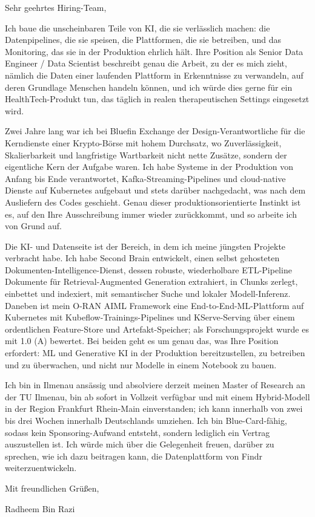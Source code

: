 \documentclass[11pt,a4paper]{coverletter}
\begin{document}
\opening{Sehr geehrtes Hiring-Team,}

Ich baue die unscheinbaren Teile von KI, die sie verlässlich machen: die Datenpipelines, die sie speisen, die Plattformen, die sie betreiben, und das Monitoring, das sie in der Produktion ehrlich hält. Ihre Position als Senior Data Engineer / Data Scientist beschreibt genau die Arbeit, zu der es mich zieht, nämlich die Daten einer laufenden Plattform in Erkenntnisse zu verwandeln, auf deren Grundlage Menschen handeln können, und ich würde dies gerne für ein HealthTech-Produkt tun, das täglich in realen therapeutischen Settings eingesetzt wird.

Zwei Jahre lang war ich bei Bluefin Exchange der Design-Verantwortliche für die Kerndienste einer Krypto-Börse mit hohem Durchsatz, wo Zuverlässigkeit, Skalierbarkeit und langfristige Wartbarkeit nicht nette Zusätze, sondern der eigentliche Kern der Aufgabe waren. Ich habe Systeme in der Produktion von Anfang bis Ende verantwortet, Kafka-Streaming-Pipelines und cloud-native Dienste auf Kubernetes aufgebaut und stets darüber nachgedacht, was nach dem Ausliefern des Codes geschieht. Genau dieser produktionsorientierte Instinkt ist es, auf den Ihre Ausschreibung immer wieder zurückkommt, und so arbeite ich von Grund auf.

Die KI- und Datenseite ist der Bereich, in dem ich meine jüngsten Projekte verbracht habe. Ich habe Second Brain entwickelt, einen selbst gehosteten Dokumenten-Intelligence-Dienst, dessen robuste, wiederholbare ETL-Pipeline Dokumente für Retrieval-Augmented Generation extrahiert, in Chunks zerlegt, einbettet und indexiert, mit semantischer Suche und lokaler Modell-Inferenz. Daneben ist mein O-RAN AIML Framework eine End-to-End-ML-Plattform auf Kubernetes mit Kubeflow-Trainings-Pipelines und KServe-Serving über einem ordentlichen Feature-Store und Artefakt-Speicher; als Forschungsprojekt wurde es mit 1.0 (A) bewertet. Bei beiden geht es um genau das, was Ihre Position erfordert: ML und Generative KI in der Produktion bereitzustellen, zu betreiben und zu überwachen, und nicht nur Modelle in einem Notebook zu bauen.

Ich bin in Ilmenau ansässig und absolviere derzeit meinen Master of Research an der TU Ilmenau, bin ab sofort in Vollzeit verfügbar und mit einem Hybrid-Modell in der Region Frankfurt Rhein-Main einverstanden; ich kann innerhalb von zwei bis drei Wochen innerhalb Deutschlands umziehen. Ich bin Blue-Card-fähig, sodass kein Sponsoring-Aufwand entsteht, sondern lediglich ein Vertrag auszustellen ist. Ich würde mich über die Gelegenheit freuen, darüber zu sprechen, wie ich dazu beitragen kann, die Datenplattform von Findr weiterzuentwickeln.

\closing{Mit freundlichen Grüßen,}{Radheem Bin Razi}
\end{document}
